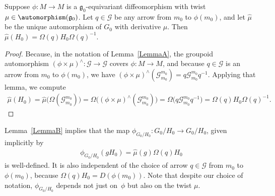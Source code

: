 \begin{LemmaBlaom}\label{LemmaB}
 Suppose $\phi \colon M \rightarrow M$ is a ${\mathfrak
    g}_0$-equivariant diffeomorphism with twist $\mu \in
  \automorphism({\mathfrak g}_0)$. Let $q \in {\mathcal G} $ be any
  arrow from $m_0$ to $\phi(m_0)$, and let $\hat\mu$ be the unique
  automorphism of $G_0$ with derivative $\mu$. Then
  $\hat\mu(H_0)=\Omega(q)H_0 \Omega(q)^{-1}$.
\end{LemmaBlaom}
\begin{proof}
  Because, in the notation of Lemma~\ref{LemmaA}, the groupoid
  automorphism $(\phi \times \mu)^\wedge \colon {\mathcal G}
  \rightarrow {\mathcal G} $ covers $\phi \colon M \rightarrow M$, and
  because $q \in {\mathcal G} $ is an arrow from $m_0$ to $\phi(m_0)$,
  we have $(\phi \times \mu)^\wedge({\mathcal G}_{m_0}^{m_0})=q
  {\mathcal G}_{m_0}^{m_0}q^{-1}$. Applying that lemma, we
  compute
  \begin{gather*}
    \hat\mu(H_0)=\hat\mu\big(\Omega({\mathcal G}_{m_0}^{m_0})\big)=\Omega\big( (\phi \times \mu)^\wedge({\mathcal G}_{m_0}^{m_0}) \big)=\Omega\big(q {\mathcal G}_{m_0}^{m_0}q^{-1}\big)=\Omega(q)H_0 \Omega(q)^{-1}.\tag*{\qed}
  \end{gather*}
  \renewcommand{\qed}{}
\end{proof}

Lemma~\ref{LemmaB} implies that the map $\phi_{G_0/H_0}\colon {G_0/H_0}
\rightarrow {G_0/H_0}$, given implicitly by
\begin{gather}
  \phi_{G_0/H_0} (g H_0)=\hat\mu(g)\Omega(q)H_0
  \label{abox}
\end{gather}
is well-def\/ined. It is also independent of the choice of arrow $q \in
{\mathcal G} $ from $m_0$ to $\phi(m_0)$, because
$\Omega(q)H_0=D(\phi(m_0))$. Note that despite our choice of notation,
$\phi_{G_0/H_0}$ depends not just on~$\phi $ but also on the twist
$\mu$.

